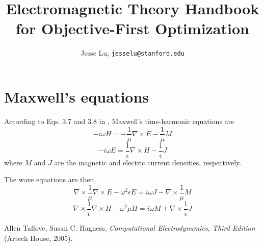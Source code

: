 \documentclass{article}
\title{Electromagnetic Theory Handbook for Objective-First Optimization}
\author{Jesse Lu, \texttt{jesselu@stanford.edu}}
\newcommand{\be}{\begin{equation}}
\newcommand{\ee}{\end{equation}}
\newcommand{\curl}{\nabla\times}
\newcommand{\eps}{\epsilon}
\newcommand{\inv}{\frac{1}}
\begin{document}
\maketitle
\tableofcontents

\section{Maxwell's equations}
According to Eqs. 3.7 and 3.8 in \cite{TH}, Maxwell's time-harmonic equations are
\be -i \omega H = -\inv{\mu} \curl E - \inv{\mu} M \ee
\be -i \omega E = \inv{\epsilon} \curl H - \inv{\eps} J \ee
where $M$ and $J$ are the magnetic and electric current densities, respectively.

The wave equations are then,
\be \curl \inv{\mu} \curl E - \omega^2 \eps E = i \omega J - 
    \curl \inv{\mu} M \ee
\be \curl \inv{\eps} \curl H - \omega^2 \mu H = i \omega M + 
    \curl \inv{\eps} J \ee

\begin{thebibliography}{99}
 Allen Taflove, Susan C. Hagness, \emph{Computational Electrodynamics, Third Edition} (Artech House, 2005). 
\end{thebibliography}
\end{document}
